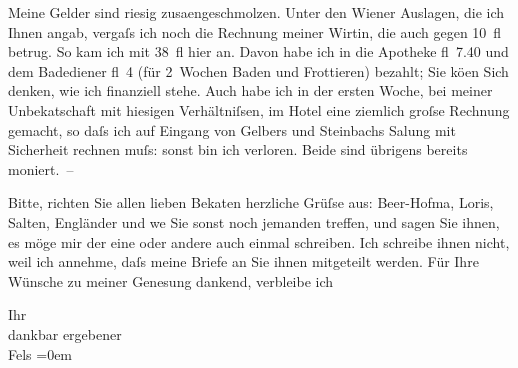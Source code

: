 \pstart
           Meine Gelder sind riesig zusa{\geminationm}engeschmolzen. Unter den
                  Wiener Auslagen, die ich Ihnen angab, vergaſs
                  {\pb}ich noch die Rechnung meiner Wirtin, die auch gegen 10 fl betrug. So kam
               ich mit 38 fl hier an. Davon habe ich in die Apotheke fl 7.40 und dem Badediener fl 4
               (für 2 Wochen Baden und Frottieren) bezahlt; Sie kö{\geminationn}en
               Sich denken, wie ich finanziell stehe. Auch habe ich in der ersten Woche, bei meiner
                  Unbeka{\geminationn}tschaft mit hiesigen Verhältniſsen, im Hotel
               eine ziemlich groſse Rechnung gemacht, so daſs ich auf Eingang von Gelbers und Steinbachs Sa{\geminationm}lung mit Sicherheit rechnen muſs:
               sonst bin ich verloren. Beide sind übrigens bereits moniert. –\pend
           
\pstart
           Bitte, richten Sie allen lieben Beka{\geminationn}ten herzliche
               Grüſse aus: Beer-Hofma{\geminationn}, Loris, Salten, Engländer und we{\geminationn} Sie sonst noch jemanden treffen, und sagen Sie ihnen,
               es möge mir der eine oder andere auch einmal schreiben. Ich schreibe ihnen nicht,
               weil ich annehme, daſs meine Briefe an Sie ihnen mitgeteilt werden. Für Ihre Wünsche
               zu meiner Genesung dankend, verbleibe ich\pend
           
\pstart
           Ihr{\\[\baselineskip]}dankbar ergebener{\\[\baselineskip]}\spacefill\mbox{Fels}\pend
           \leftskip=0em{}\endnumbering{}  \newcommand{\dateiname}{L00181}\newcommand{\titel}{Friedrich M. Fels an Arthur Schnitzler, 23. 2. 1893}\newcommand{\editorInnen}{Martin Anton Müller und Gerd-Hermann Susen}
